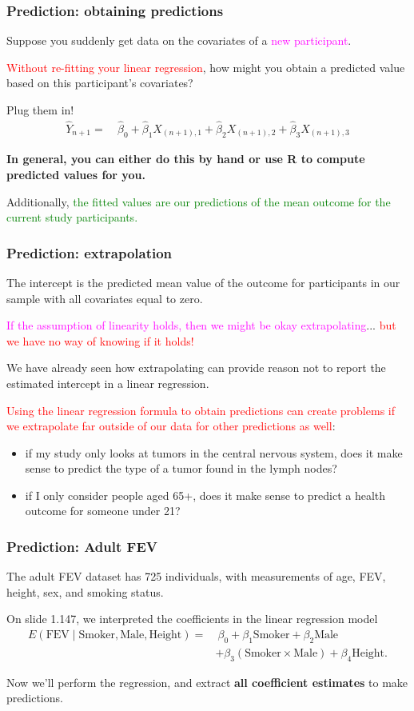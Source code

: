 \documentclass[12pt, 
hyperref={colorlinks=true, linkcolor=blue, urlcolor=cyan},dvipsnames]{beamer}
\begin{document}
\begin{frame}
\frametitle{Prediction: obtaining predictions}
Suppose you suddenly get data on the covariates of a \textcolor{magenta}{new participant}. 

\textcolor{red}{Without re-fitting your linear regression}, how might you obtain a predicted value based on this participant's covariates? \pause

Plug them in! 
\begin{align*}
\widehat{Y}_{n+1} = & \ \hat{\beta}_0 + \hat{\beta}_1 X_{(n+1),1} + \hat{\beta}_2 X_{(n+1),2} + \hat{\beta}_3 X_{(n+1),3}
\end{align*}

\textbf{In general, you can either do this by hand or use R to compute predicted values for you.}

Additionally, \textcolor{green}{the fitted values are our predictions of the mean outcome for the current study participants.}
\end{frame}

\begin{frame}
\frametitle{Prediction: extrapolation}
The intercept is the predicted mean value of the outcome for participants in our sample with all covariates equal to zero.

\textcolor{magenta}{If the assumption of linearity holds, then we might be okay extrapolating}... \textcolor{red}{but we have no way of knowing if it holds!}

We have already seen how extrapolating can provide reason not to report the estimated intercept in a linear regression.

\textcolor{red}{Using the linear regression formula to obtain predictions can create problems if we extrapolate far outside of our data for other predictions as well}: \vspace{-0.3cm}
\begin{itemize}
\item if my study only looks at tumors in the central nervous system, does it make sense to predict the type of a tumor found in the lymph nodes?
\item if I only consider people aged 65+, does it make sense to predict a health outcome for someone under 21?
\end{itemize}
\end{frame}

\begin{frame}
\frametitle{Prediction: Adult FEV}
The adult FEV dataset has 725 individuals, with measurements of age, FEV, height, sex, and smoking status.

On slide 1.147, we interpreted the coefficients in the linear regression model
\begin{align*}
E(\text{FEV} \mid \text{Smoker}, \text{Male}, \text{Height}) = & \ \beta_0 + \beta_1 \text{Smoker} + \beta_2 \text{Male} \\
&+ \beta_3 (\text{Smoker}\times\text{Male}) + \beta_4 \text{Height}.
\end{align*} 

Now we'll perform the regression, and extract \textbf{all coefficient estimates} to make predictions.
\end{frame}
\end{document}
